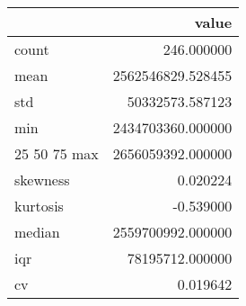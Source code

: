 \begin{tabular}{lr}
\toprule
 & value \\
\midrule
count & 246.000000 \\
mean & 2562546829.528455 \\
std & 50332573.587123 \\
min & 2434703360.000000 \\
25%
50%
75%
max & 2656059392.000000 \\
skewness & 0.020224 \\
kurtosis & -0.539000 \\
median & 2559700992.000000 \\
iqr & 78195712.000000 \\
cv & 0.019642 \\
\bottomrule
\end{tabular}
